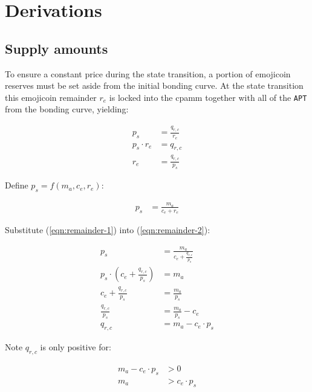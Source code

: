 \documentclass[table, twocolumn]{article}
\begin{document}
\section{Derivations}

\subsection{Supply amounts} \label{sec:supply-amounts}

To ensure a constant price during the state transition, a portion of emojicoin reserves
must be set aside from the initial bonding curve. At the state transition this emojicoin
remainder $r_e$ is locked into the \gls*{cpamm} together with all of the \texttt{APT}
from the bonding curve, yielding:

\begin{align} \label{eqn:remainder-1}
  p_s           & = \frac{q_{r, c}}{r_e} \nonumber \\
  p_s \cdot r_e & = q_{r, c} \nonumber             \\
  r_e           & = \frac{q_{r, c}}{p_s}
\end{align}

Define $p_s = f(m_a, c_e, r_e)$:

\begin{align} \label{eqn:remainder-2}
  p_s & = \frac{m_a}{c_e + r_e}
\end{align}

Substitute (\ref{eqn:remainder-1}) into (\ref{eqn:remainder-2}):

\begin{align} \label{eqn:remainder-3}
  p_s                                                & =
  \frac{m_a}{c_e + \frac{q_{r, c}}{p_s}} \nonumber                                 \\
  p_s \cdot \left(c_e + \frac{q_{r, c}}{p_s} \right) & = m_a \nonumber             \\
  c_e + \frac{q_{r, c}}{p_s}                         & = \frac{m_a}{p_s} \nonumber \\
  \frac{q_{r, c}}{p_s}                               & =
  \frac{m_a}{p_s} - c_e \nonumber                                                  \\
  q_{r, c}                                           & = m_a - c_e \cdot p_s
\end{align}

Note $q_{r, c}$ is only positive for:

\begin{align} \label{eqn:remainder-4}
  m_a - c_e \cdot p_s & > 0 \nonumber   \\
  m_a                 & > c_e \cdot p_s
\end{align}
\end{document}
